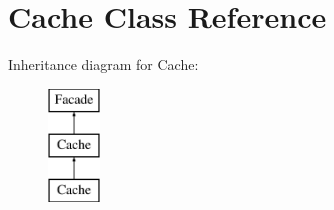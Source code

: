 \section{Cache Class Reference}
\label{class_cache}
Inheritance diagram for Cache\+:\begin{figure}[H]
\begin{center}
\leavevmode
\includegraphics[height=3.000000cm]{class_cache}
\end{center}
\end{figure}
